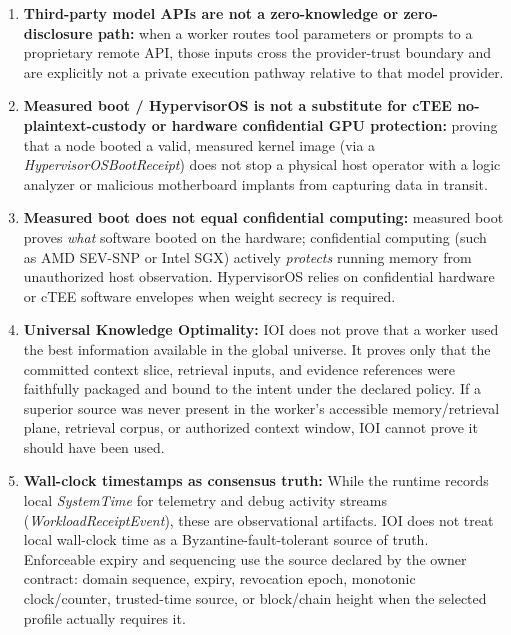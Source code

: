 \documentclass[
  11pt,
]{article}
\begin{document}
\begin{enumerate}
  loaded in plaintext into standard GPU memory on a hostile-root system.
  If a model owner mounts unencrypted weights on a remote machine
  without hardware confidential compute (TEEs) or cryptographic-operator
  partitioning, those weights can be dumped by the host administrator.
\item
  \textbf{Third-party model APIs are not a zero-knowledge or
  zero-disclosure path:} when a worker routes tool parameters or prompts
  to a proprietary remote API, those inputs cross the provider-trust
  boundary and are explicitly not a private execution pathway relative
  to that model provider.
\item
  \textbf{Measured boot / HypervisorOS is not a substitute for cTEE
  no-plaintext-custody or hardware confidential GPU protection:} proving
  that a node booted a valid, measured kernel image (via a
  \emph{HypervisorOSBootReceipt}) does not stop a physical host operator with a
  logic analyzer or malicious motherboard implants from capturing data
  in transit.
\item
  \textbf{Measured boot does not equal confidential computing:} measured
  boot proves \emph{what} software booted on the hardware; confidential
  computing (such as AMD SEV-SNP or Intel SGX) actively \emph{protects}
  running memory from unauthorized host observation. HypervisorOS relies
  on confidential hardware or cTEE software envelopes when weight
  secrecy is required.
\item
  \textbf{Universal Knowledge Optimality:} IOI does not prove that a
  worker used the best information available in the global universe. It
  proves only that the committed context slice, retrieval inputs, and
  evidence references were faithfully packaged and bound to the intent
  under the declared policy. If a superior source was never present in
  the worker's accessible memory/retrieval plane, retrieval corpus, or
  authorized context window, IOI cannot prove it should have been used.
\item
  \textbf{Wall-clock timestamps as consensus truth:} While the runtime
  records local \emph{SystemTime} for telemetry and debug activity
  streams (\emph{WorkloadReceiptEvent}), these are observational
  artifacts. IOI does not treat local wall-clock time as a
  Byzantine-fault-tolerant source of truth. Enforceable expiry and sequencing
  use the source declared by the owner contract: domain sequence, expiry,
  revocation epoch, monotonic clock/counter, trusted-time source, or block/chain
  height when the selected profile actually requires it.

\end{enumerate}
\end{document}
